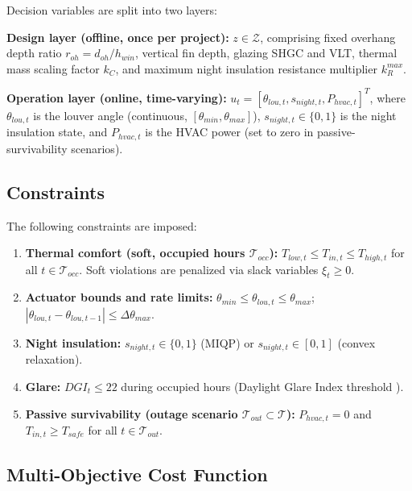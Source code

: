 \documentclass[preprint,12pt]{elsarticle}
\begin{document}
Decision variables are split into two layers:

\textbf{Design layer (offline, once per project):} $z \in \mathcal{Z}$, comprising fixed overhang depth ratio $r_{oh} = d_{oh}/h_{win}$, vertical fin depth, glazing SHGC and VLT, thermal mass scaling factor $k_C$, and maximum night insulation resistance multiplier $k_R^{max}$.

\textbf{Operation layer (online, time-varying):} $u_t = [\theta_{lou,t}, s_{night,t}, P_{hvac,t}]^T$, where $\theta_{lou,t}$ is the louver angle (continuous, $[\theta_{min}, \theta_{max}]$), $s_{night,t} \in \{0,1\}$ is the night insulation state, and $P_{hvac,t}$ is the HVAC power (set to zero in passive-survivability scenarios).

\subsection{Constraints}
\label{sec:constraints}

The following constraints are imposed:

\begin{enumerate}
\item \textbf{Thermal comfort (soft, occupied hours $\mathcal{T}_{occ}$):} $T_{low,t} \leq T_{in,t} \leq T_{high,t}$ for all $t \in \mathcal{T}_{occ}$. Soft violations are penalized via slack variables $\xi_t \geq 0$.

\item \textbf{Actuator bounds and rate limits:} $\theta_{min} \leq \theta_{lou,t} \leq \theta_{max}$; $|\theta_{lou,t} - \theta_{lou,t-1}| \leq \Delta\theta_{max}$.

\item \textbf{Night insulation:} $s_{night,t} \in \{0,1\}$ (MIQP) or $s_{night,t} \in [0,1]$ (convex relaxation).

\item \textbf{Glare:} $DGI_t \leq 22$ during occupied hours (Daylight Glare Index threshold \cite{wienold2006}).

\item \textbf{Passive survivability (outage scenario $\mathcal{T}_{out} \subset \mathcal{T}$):} $P_{hvac,t} = 0$ and $T_{in,t} \geq T_{safe}$ for all $t \in \mathcal{T}_{out}$.
\end{enumerate}

\subsection{Multi-Objective Cost Function}
\end{document}

